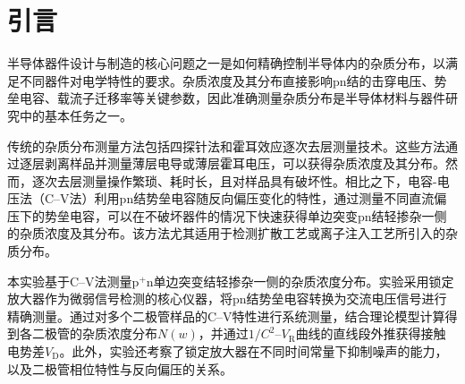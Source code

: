 \section{引言}

半导体器件设计与制造的核心问题之一是如何精确控制半导体内的杂质分布，以满足不同器件对电学特性的要求。杂质浓度及其分布直接影响pn结的击穿电压、势垒电容、载流子迁移率等关键参数，因此准确测量杂质分布是半导体材料与器件研究中的基本任务之一。

传统的杂质分布测量方法包括四探针法和霍耳效应逐次去层测量技术。这些方法通过逐层剥离样品并测量薄层电导或薄层霍耳电压，可以获得杂质浓度及其分布。然而，逐次去层测量操作繁琐、耗时长，且对样品具有破坏性。相比之下，电容-电压法（C--V法）利用pn结势垒电容随反向偏压变化的特性，通过测量不同直流偏压下的势垒电容，可以在不破坏器件的情况下快速获得单边突变pn结轻掺杂一侧的杂质浓度及其分布。该方法尤其适用于检测扩散工艺或离子注入工艺所引入的杂质分布。

本实验基于C--V法测量$\mathrm{p}^+\mathrm{n}$单边突变结轻掺杂一侧的杂质浓度分布。实验采用锁定放大器作为微弱信号检测的核心仪器，将pn结势垒电容转换为交流电压信号进行精确测量。通过对多个二极管样品的C--V特性进行系统测量，结合理论模型计算得到各二极管的杂质浓度分布$N(w)$，并通过$1/C^{2}$--$V_{\mathrm{R}}$曲线的直线段外推获得接触电势差$V_{\mathrm{D}}$。此外，实验还考察了锁定放大器在不同时间常量下抑制噪声的能力，以及二极管相位特性与反向偏压的关系。
